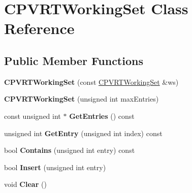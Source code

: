 \hypertarget{class_c_p_v_r_t_working_set}{\section{C\+P\+V\+R\+T\+Working\+Set Class Reference}
\label{class_c_p_v_r_t_working_set}
}
\subsection*{Public Member Functions}
\begin{DoxyCompactItemize}
\item 
\hypertarget{class_c_p_v_r_t_working_set_acc5d10f16902c6ceb1120befe15cfa8f}{{\bfseries C\+P\+V\+R\+T\+Working\+Set} (const \hyperlink{class_c_p_v_r_t_working_set}{C\+P\+V\+R\+T\+Working\+Set} \&ws)}\label{class_c_p_v_r_t_working_set_acc5d10f16902c6ceb1120befe15cfa8f}

\item 
\hypertarget{class_c_p_v_r_t_working_set_aeab114a06ca2dfe1e912904fde1a3849}{{\bfseries C\+P\+V\+R\+T\+Working\+Set} (unsigned int max\+Entries)}\label{class_c_p_v_r_t_working_set_aeab114a06ca2dfe1e912904fde1a3849}

\item 
\hypertarget{class_c_p_v_r_t_working_set_a011faa4c0c71ca4ffc7571d41c544614}{const unsigned int $\ast$ {\bfseries Get\+Entries} () const }\label{class_c_p_v_r_t_working_set_a011faa4c0c71ca4ffc7571d41c544614}

\item 
\hypertarget{class_c_p_v_r_t_working_set_acca3949e031b08108e161b3e8bf13e81}{unsigned int {\bfseries Get\+Entry} (unsigned int index) const }\label{class_c_p_v_r_t_working_set_acca3949e031b08108e161b3e8bf13e81}

\item 
\hypertarget{class_c_p_v_r_t_working_set_a94abd2835b3fd681c27b242488303451}{bool {\bfseries Contains} (unsigned int entry) const }\label{class_c_p_v_r_t_working_set_a94abd2835b3fd681c27b242488303451}

\item 
\hypertarget{class_c_p_v_r_t_working_set_ae88d3502e657c02c2a9e284a90198c48}{bool {\bfseries Insert} (unsigned int entry)}\label{class_c_p_v_r_t_working_set_ae88d3502e657c02c2a9e284a90198c48}

\item 
\hypertarget{class_c_p_v_r_t_working_set_ae86c00fa370f5de4072a61b8f65e6fad}{void {\bfseries Clear} ()}\label{class_c_p_v_r_t_working_set_ae86c00fa370f5de4072a61b8f65e6fad}


\end{DoxyCompactItemize}
